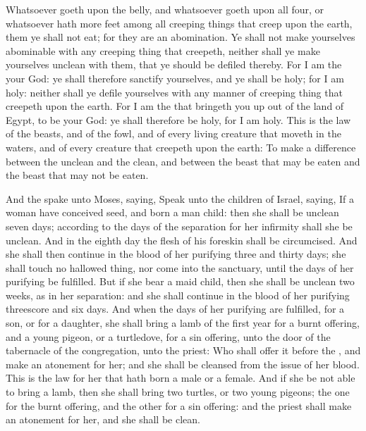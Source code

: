\begin{biblechapter}
\verse Whatsoever goeth upon the belly, and whatsoever goeth upon all four, or whatsoever hath more feet among all creeping things that creep upon the earth, them ye shall not eat; for they are an abomination.
\verse Ye shall not make yourselves abominable with any creeping thing that creepeth, neither shall ye make yourselves unclean with them, that ye should be defiled thereby.
\verse For I am the \LORD your God: ye shall therefore sanctify yourselves, and ye shall be holy; for I am holy: neither shall ye defile yourselves with any manner of creeping thing that creepeth upon the earth.
\verse For I am the \LORD that bringeth you up out of the land of Egypt, to be your God: ye shall therefore be holy, for I am holy.
\verse This is the law of the beasts, and of the fowl, and of every living creature that moveth in the waters, and of every creature that creepeth upon the earth:
\verse To make a difference between the unclean and the clean, and between the beast that may be eaten and the beast that may not be eaten.
\end{biblechapter}

\begin{biblechapter} %
 And the \LORD spake unto Moses, saying,
\verse Speak unto the children of Israel, saying, If a woman have conceived seed, and born a man child: then she shall be unclean seven days; according to the days of the separation for her infirmity shall she be unclean.
\verse And in the eighth day the flesh of his foreskin shall be circumcised.
\verse And she shall then continue in the blood of her purifying three and thirty days; she shall touch no hallowed thing, nor come into the sanctuary, until the days of her purifying be fulfilled.
\verse But if she bear a maid child, then she shall be unclean two weeks, as in her separation: and she shall continue in the blood of her purifying threescore and six days.
\verse And when the days of her purifying are fulfilled, for a son, or for a daughter, she shall bring a lamb of the first year for a burnt offering, and a young pigeon, or a turtledove, for a sin offering, unto the door of the tabernacle of the congregation, unto the priest:
\verse Who shall offer it before the \LORD, and make an atonement for her; and she shall be cleansed from the issue of her blood. This is the law for her that hath born a male or a female.
\verse And if she be not able to bring a lamb, then she shall bring two turtles, or two young pigeons; the one for the burnt offering, and the other for a sin offering: and the priest shall make an atonement for her, and she shall be clean.
\end{biblechapter}

